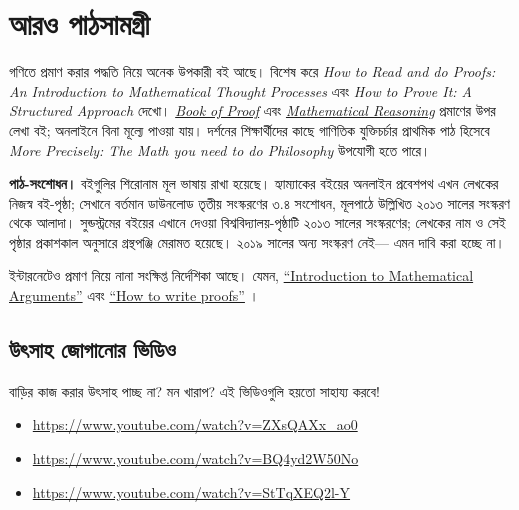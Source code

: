 \documentclass[../../../include/open-logic-section]{subfiles}
\begin{document}

\section{আরও পাঠসামগ্রী}

গণিতে প্রমাণ করার পদ্ধতি নিয়ে অনেক উপকারী বই
আছে। বিশেষ করে \emph{How to Read and do Proofs: An
Introduction to Mathematical Thought Processes}
\citep{Solow2013} এবং \emph{How to Prove It: A
Structured Approach} \citep{Velleman2019} দেখো।
\href{https://richardhammack.github.io/BookOfProof/}{\emph{Book
of Proof}} \citep{Hammack2013} এবং
\href{https://scholarworks.gvsu.edu/books/7/}{\emph{Mathematical
Reasoning}} \citep{Sandstrum2019} প্রমাণের উপর
লেখা বই; অনলাইনে বিনা মূল্যে পাওয়া যায়।
দর্শনের শিক্ষার্থীদের কাছে গাণিতিক যুক্তিচর্চার
প্রাথমিক পাঠ হিসেবে \emph{More
Precisely: The Math you need to do Philosophy}
\citep{Steinhart2018} উপযোগী হতে পারে।
\par\noindent\textbf{পাঠ-সংশোধন।} বইগুলির শিরোনাম মূল ভাষায় রাখা হয়েছে। হ্যাম্যাকের বইয়ের
অনলাইন প্রবেশপথ এখন লেখকের নিজস্ব বই-পৃষ্ঠা; সেখানে
বর্তমান ডাউনলোড তৃতীয় সংস্করণের ৩.৪ সংশোধন, মূলপাঠে
উল্লিখিত ২০১৩ সালের সংস্করণ থেকে আলাদা। সুন্ডস্ট্রমের
বইয়ের এখানে দেওয়া বিশ্ববিদ্যালয়-পৃষ্ঠাটি ২০১৩ সালের
সংস্করণের; লেখকের নাম ও সেই পৃষ্ঠার প্রকাশকাল অনুসারে
গ্রন্থপঞ্জি মেরামত হয়েছে। ২০১৯ সালের অন্য সংস্করণ নেই—
এমন দাবি করা হচ্ছে না।

ইন্টারনেটেও প্রমাণ নিয়ে নানা সংক্ষিপ্ত নির্দেশিকা
আছে। যেমন,
\href{https://math.berkeley.edu/~hutching/teach/proofs.pdf}{``Introduction
  to Mathematical Arguments''} \citep{Hutchings2003} এবং
\href{https://eugeniacheng.com/wp-content/uploads/2017/02/cheng-proofguide.pdf}{``How to
  write proofs''} \citep{Cheng2004}।

\subsection{উৎসাহ জোগানোর ভিডিও}

বাড়ির কাজ করার উৎসাহ পাচ্ছ না? মন খারাপ?
এই ভিডিওগুলি হয়তো সাহায্য করবে!

\begin{itemize}
\item \url{https://www.youtube.com/watch?v=ZXsQAXx_ao0}
\item \url{https://www.youtube.com/watch?v=BQ4yd2W50No}
\item \url{https://www.youtube.com/watch?v=StTqXEQ2l-Y}
\end{itemize}
\end{document}
